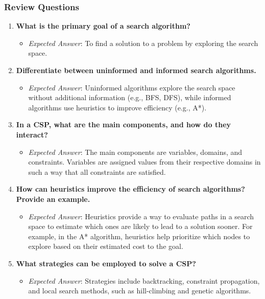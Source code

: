 \documentclass[aspectratio=169]{beamer}
\begin{document}
\begin{frame}[fragile]
    \frametitle{Review Questions}
    \begin{enumerate}
        \item \textbf{What is the primary goal of a search algorithm?}
            \begin{itemize}
                \item \textit{Expected Answer}: To find a solution to a problem by exploring the search space.
            \end{itemize}

        \item \textbf{Differentiate between uninformed and informed search algorithms.}
            \begin{itemize}
                \item \textit{Expected Answer}: Uninformed algorithms explore the search space without additional information (e.g., BFS, DFS), while informed algorithms use heuristics to improve efficiency (e.g., A*).
            \end{itemize}

        \item \textbf{In a CSP, what are the main components, and how do they interact?}
            \begin{itemize}
                \item \textit{Expected Answer}: The main components are variables, domains, and constraints. Variables are assigned values from their respective domains in such a way that all constraints are satisfied.
            \end{itemize}

        \item \textbf{How can heuristics improve the efficiency of search algorithms? Provide an example.}
            \begin{itemize}
                \item \textit{Expected Answer}: Heuristics provide a way to evaluate paths in a search space to estimate which ones are likely to lead to a solution sooner. For example, in the A* algorithm, heuristics help prioritize which nodes to explore based on their estimated cost to the goal.
            \end{itemize}

        \item \textbf{What strategies can be employed to solve a CSP?}
            \begin{itemize}
                \item \textit{Expected Answer}: Strategies include backtracking, constraint propagation, and local search methods, such as hill-climbing and genetic algorithms.
            \end{itemize}
    \end{enumerate}
\end{frame}
\end{document}
